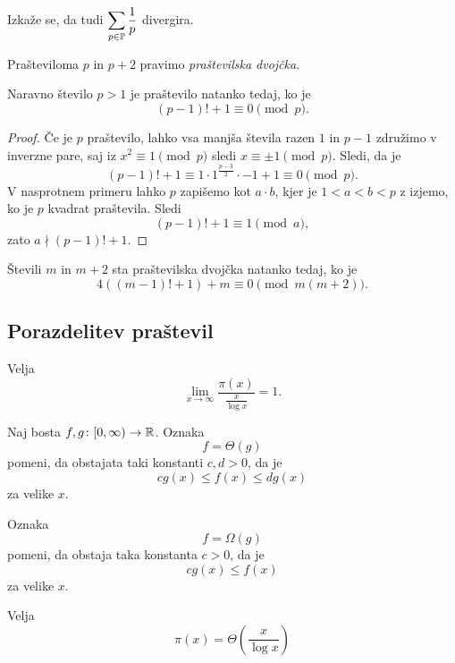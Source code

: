 \documentclass[12pt, a4paper]{article}
\begin{document}
Izkaže se, da tudi $\displaystyle\sum_{p\in\P}\frac{1}{p}$ divergira.


\begin{definicija}
Prašteviloma $p$ in $p+2$ pravimo \emph{praštevilska dvojčka}.
\end{definicija}

\begin{izrek}[Wilson]
Naravno število $p>1$ je praštevilo natanko tedaj, ko je
\[
(p-1)!+1\equiv 0\pmod{p}.
\]
\end{izrek}

\begin{proof}
Če je $p$ praštevilo, lahko vsa manjša števila razen $1$ in $p-1$ združimo v inverzne pare, saj iz $x^2\equiv 1\pmod{p}$ sledi $x\equiv\pm 1\pmod{p}$. Sledi, da je
\[
(p-1)!+1\equiv 1\cdot 1^{\frac{p-3}{2}}\cdot -1+1\equiv 0\pmod{p}.
\]
V nasprotnem primeru lahko $p$ zapišemo kot $a\cdot b$, kjer je $1<a<b<p$ z izjemo, ko je $p$ kvadrat praštevila. Sledi
\[
(p-1)!+1\equiv 1\pmod{a},
\]
zato $a\nmid (p-1)!+1$.
\end{proof}

\begin{izrek}
Števili $m$ in $m+2$ sta praštevilska dvojčka natanko tedaj, ko je
\[
4((m-1)!+1)+m\equiv 0\pmod{m(m+2)}.
\]
\end{izrek}


\newpage

\subsection{Porazdelitev praštevil}

\begin{izrek}
Velja
\[
\lim_{x\to\infty}\frac{\pi(x)}{\frac{x}{\log{x}}}=1.
\]
\end{izrek}

\begin{definicija}
Naj bosta $f,g\colon[0,\infty)\to\R$. Oznaka
\[
f=\Theta(g)
\]
pomeni, da obstajata taki konstanti $c,d>0$, da je
\[
cg(x)\leq f(x)\leq dg(x)
\]
za velike $x$.

Oznaka
\[
f=\Omega(g)
\]
pomeni, da obstaja taka konstanta $c>0$, da je
\[
cg(x)\leq f(x)
\]
za velike $x$.
\end{definicija}

\begin{izrek}[Čebišev]
Velja
\[
\pi(x)=\Theta\left(\frac{x}{\log{x}}\right)
\]
\end{izrek}
\end{document}
